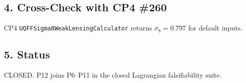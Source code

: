 \documentclass[
]{article}
\begin{document}
\subsection{4. Cross-Check with CP4
\#260}\label{cross-check-with-cp4-260}

CP4 \texttt{UQFFSigma8WeakLensingCalculator} returns
\(\sigma_8 = 0.797\) for default inputs.

\subsection{5. Status}\label{status}

CLOSED. P12 joins P6--P11 in the closed Lagrangian falsifiability suite.




\end{document}
